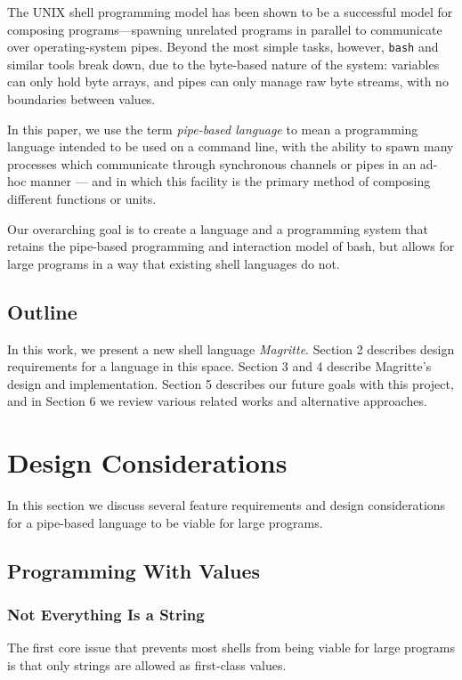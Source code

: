 \documentclass[english,PRO]{ipsj}
\begin{document}
\noindent
The UNIX shell programming model has been shown to be a successful model for composing programs---spawning unrelated programs in parallel to communicate over operating-system pipes. Beyond the most simple tasks, however, \verb/bash/ and similar tools break down, due to the byte-based nature of the system: variables can only hold byte arrays, and pipes can only manage raw byte streams, with no boundaries between values.

In this paper, we use the term \emph{pipe-based language} to mean a programming language intended to be used on a command line, with the ability to spawn many processes which communicate through synchronous channels or pipes in an ad-hoc manner --- and in which this facility is the primary method of composing different functions or units.

Our overarching goal is to create a language and a programming system that retains the pipe-based programming and interaction model of bash, but allows for large programs in a way that existing shell languages do not.

\subsection*{Outline}\noindent
In this work, we present a new shell language \emph{Magritte}. Section 2 describes design requirements for a language in this space. Section 3 and 4 describe Magritte's design and implementation. Section 5 describes our future goals with this project, and in Section 6 we review various related works and alternative approaches.

\section{Design Considerations}\label{design-considerations}\noindent
In this section we discuss several feature requirements and design considerations for a pipe-based language to be viable for large programs.

\subsection{Programming With Values}
\subsubsection{Not Everything Is a String}\noindent
The first core issue that prevents most shells from being viable for large programs is that only strings are allowed as first-class values.
\end{document}

